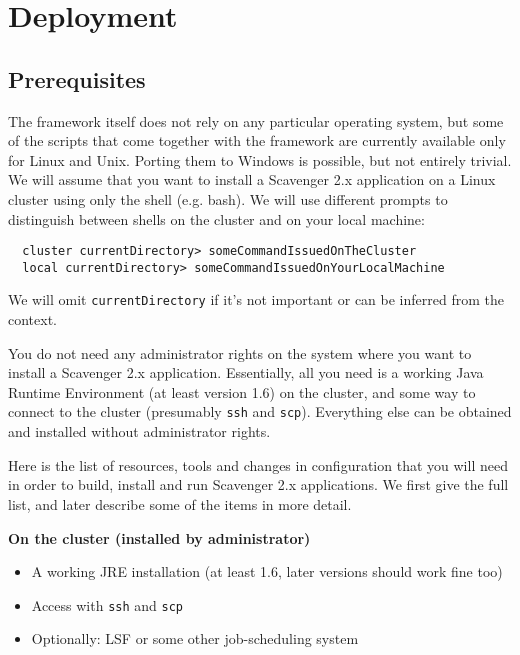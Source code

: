 \documentclass{scrbook}
\begin{document}
\chapter{Deployment}
\section{Prerequisites}
The framework itself does not rely on any particular operating system,
but some of the scripts that come together with the framework are
currently available only for Linux and Unix. 
Porting them to Windows is possible, but not entirely trivial.
We will assume that you want to install a Scavenger 2.x application 
on a Linux cluster using only the shell (e.g. bash).
We will use different prompts to distinguish between shells on
the cluster and on your local machine:
\begin{lstlisting}
  cluster currentDirectory> someCommandIssuedOnTheCluster
  local currentDirectory> someCommandIssuedOnYourLocalMachine
\end{lstlisting}
We will omit \lstinline{currentDirectory} 
if it's not important or can be inferred
from the context.

You do not need any administrator rights on the system where you want
to install a Scavenger 2.x application.
Essentially, all you need is a working Java Runtime Environment 
(at least version 1.6) on the cluster, and some way to connect to the cluster 
(presumably \lstinline{ssh} and \lstinline{scp}). Everything else can be
obtained and installed without administrator rights.

Here is the list of resources, tools and changes in configuration
that you will need in order to build, install and run Scavenger 2.x applications. 
We first give the full list, and later describe some of the items in more detail.

\noindent\textbf{On the cluster (installed by administrator)}
\begin{itemize}
  \item A working JRE installation 
    (at least 1.6, later versions should work fine too)
  \item Access with \lstinline{ssh} and \lstinline{scp}
  \item Optionally: LSF or some other job-scheduling system
\end{itemize}
\end{document}
